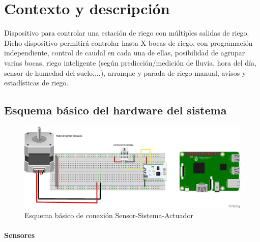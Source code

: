 \documentclass[12pt,a4paper,titlepage,oneside]{report}
\title{\titulo}
\author{\autor}
\begin{document}



\tableofcontents
\listoffigures

\chapter{Contexto y descripción}

	Dispositivo para controlar una estación de riego 
con múltiples salidas de riego. Dicho dispositivo 
permitirá controlar hasta X bocas de riego, con programación 
independiente, control de caudal en cada una de ellas, posibilidad 
de agrupar varias bocas, riego inteligente (según predicción/medición 
de lluvia, hora del día, sensor de humedad del suelo,...), arranque y
 parada de riego manual, avisos y estadísticas de riego. 

\section{Esquema básico del hardware del sistema}
	
	\begin{figure}
		\center
		\includegraphics[scale=0.5]{./images/Conexion.png}
		\caption{Esquema básico de conexión Sensor-Sistema-Actuador}
		\label{Esquema_basico}
	\end{figure}		
	
	\subsubsection*{Sensores}
\end{document}

